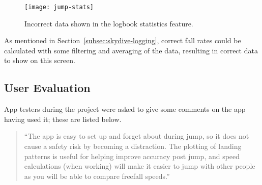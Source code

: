 \begin{figure}[ht]
  \centering
  \texttt{[image: jump-stats]}
  \caption{Incorrect data shown in the logbook statistics feature.}\label{fig:jump-stats}
\end{figure}

As mentioned in Section~\ref{subsec:skydive-logging}, correct fall rates could be calculated with some filtering and averaging of the data, resulting in correct data to show on this screen.

\subsection{User Evaluation}
App testers during the project were asked to give some comments on the app having used it; these are listed below.

\begin{quote}
``The app is easy to set up and forget about during jump, so it does not cause a safety risk by becoming a distraction. The plotting of landing patterns is useful for helping improve accuracy post jump, and speed calculations (when working) will make it easier to jump with other people as you will be able to compare freefall speeds.''
\end{quote}
